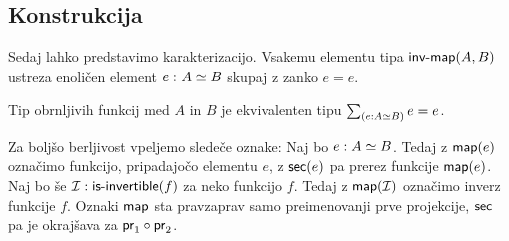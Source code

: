 \subsection{Konstrukcija}

Sedaj lahko predstavimo karakterizacijo. Vsakemu elementu tipa \(\textnormal{\textsf{inv-map}}(A, B)\) ustreza enoličen element \(e \,\colon A \simeq B\) skupaj z zanko \(e = e\).

\begin{trditev}
  \label{main-char}
  Tip obrnljivih funkcij med \(A\) in \(B\) je ekvivalenten tipu \(\textstyle \sum_{\left( e : A \simeq B \right)} e = e\).
\end{trditev}

Za boljšo berljivost vpeljemo sledeče oznake: Naj bo \(e : A \simeq B\). Tedaj z \(\textnormal{\textsf{map}}(e)\) označimo funkcijo, pripadajočo elementu \(e\), z \(\textnormal{\textsf{sec}}(e)\) pa prerez funkcije \(\textnormal{\textsf{map}}(e)\). Naj bo še \(\mathcal{I} : \textnormal{\textsf{is-invertible}}(f)\) za neko funkcijo \(f\). Tedaj z \(\textnormal{\textsf{map}}(\mathcal{I})\) označimo inverz funkcije \(f\). Oznaki \(\textnormal{\textsf{map}}\) sta pravzaprav samo preimenovanji prve projekcije, \(\textnormal{\textsf{sec}}\) pa je okrajšava za \(\textnormal{\textsf{pr}}_{1} \circ \textnormal{\textsf{pr}}_{2}\).

